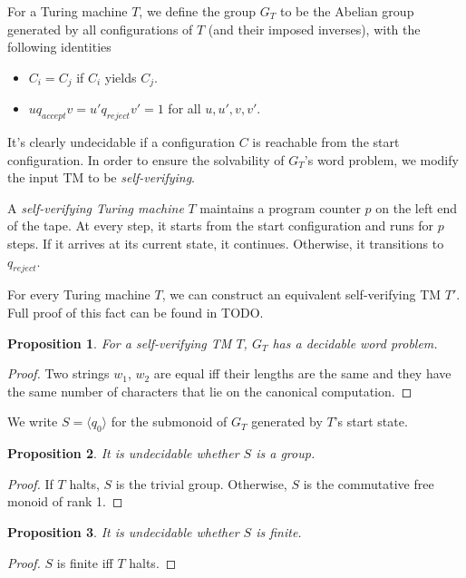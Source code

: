 \documentclass[10pt]{article} %
\newtheorem{proposition}{Proposition}
\newcommand{\defn}[1]{\textit{#1}}
\begin{document}
    For a Turing machine $T$, we define the group $G_T$ to be the
    Abelian group generated by all configurations of $T$ (and their
    imposed inverses), with the following identities
    \begin{itemize}
    \item $C_i = C_j$ if $C_i$ yields $C_j$.
    \item $uq_{accept}v = u'q_{reject}v' = 1$ for all $u, u', v, v'$.
    \end{itemize}

    It's clearly undecidable if a configuration $C$ is reachable from
    the start configuration. In order to ensure the solvability of
    $G_T$'s word problem, we modify the input TM to be
    \defn{self-verifying}.

    A \defn{self-verifying Turing machine} $T$ maintains a program
    counter $p$ on the left end of the tape. At every step, it starts
    from the start configuration and runs for $p$ steps. If it arrives
    at its current state, it continues. Otherwise, it transitions to
    $q_{reject}$.

    For every Turing machine $T$, we can construct an equivalent
    self-verifying TM $T'$. Full proof of this fact can be found in
    TODO.

    \begin{proposition}
      For a self-verifying TM $T$, $G_T$ has a decidable word problem.
    \end{proposition}
    \begin{proof}
      Two strings $w_1$, $w_2$ are equal iff their lengths are the
      same and they have the same number of characters that lie on the
      canonical computation.
    \end{proof}

    We write $S = \langle q_0 \rangle$ for the submonoid of $G_T$
    generated by $T$'s start state.

    \begin{proposition}
      It is undecidable whether $S$ is a group.
    \end{proposition}
    \begin{proof}
      If $T$ halts, $S$ is the trivial group. Otherwise, $S$ is the
      commutative free monoid of rank 1.
    \end{proof}

    \begin{proposition}
      It is undecidable whether $S$ is finite.
    \end{proposition}
    \begin{proof}
      $S$ is finite iff $T$ halts.
    \end{proof}
\end{document}
